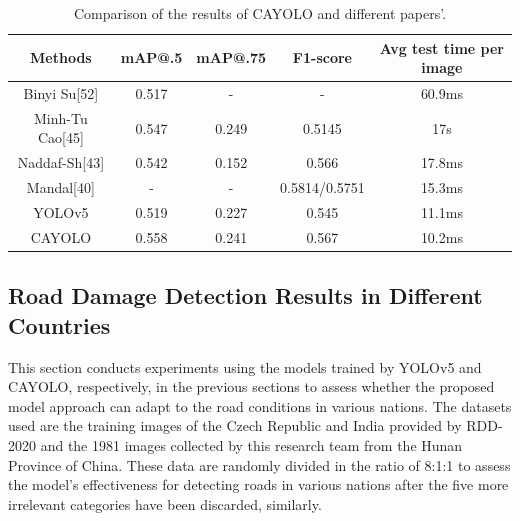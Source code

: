\documentclass[sensors,article,submit,moreauthors]{Definitions/mdpi}
\begin{document}
    \begin{table}[H]
        \caption{Comparison of the results of CAYOLO and different papers'.\label{tab:4}}
        \begin{tabularx}{\textwidth}{CCCCC}
            \toprule
            \textbf{Methods} & \textbf{mAP@.5} & \textbf{mAP@.75} & \textbf{F1-score} & \textbf{Avg test time per image} \\
            \midrule
            Binyi Su[52]     & 0.517           & -                & -                 & 60.9ms                           \\
            Minh-Tu Cao[45]  & 0.547           & 0.249            & 0.5145            & 17s                              \\
            Naddaf-Sh[43]    & 0.542           & 0.152            & 0.566             & 17.8ms                           \\
            Mandal[40]       & -               & -                & 0.5814/0.5751     & 15.3ms                           \\
            YOLOv5           & 0.519           & 0.227            & 0.545             & 11.1ms                           \\
            CAYOLO           & 0.558           & 0.241            & 0.567             & 10.2ms                           \\
            \bottomrule
        \end{tabularx}
    \end{table}

    \subsection{Road Damage Detection Results in Different Countries}

    This section conducts experiments using the models trained by YOLOv5 and CAYOLO, respectively, in the previous sections to assess whether the proposed model approach can adapt to the road conditions in various nations. The datasets used are the training images of the Czech Republic and India provided by RDD-2020 and the 1981 images collected by this research team from the Hunan Province of China. These data are randomly divided in the ratio of 8:1:1 to assess the model's effectiveness for detecting roads in various nations after the five more irrelevant categories have been discarded, similarly.
\end{document}
